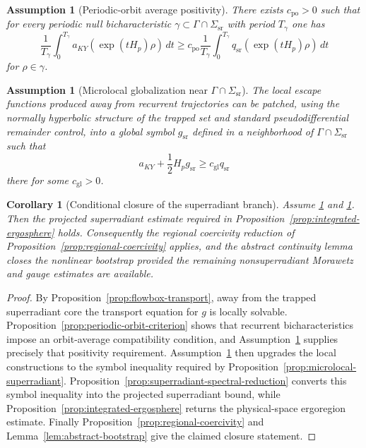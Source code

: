 \documentclass[12pt,a4paper]{article}
\newtheorem{corollary}[theorem]{Corollary}
\newtheorem{assumption}[theorem]{Assumption}
\begin{document}
\begin{assumption}[Periodic-orbit average positivity]\label{ass:periodic-average-positivity}
There exists $c_{\mathrm{po}}>0$ such that for every periodic null bicharacteristic $\gamma \subset \Gamma \cap \Sigma_{\mathrm{sr}}$ with period $T_\gamma$ one has
\begin{equation}
\frac{1}{T_\gamma}\int_0^{T_\gamma} a_{KY}(\exp(tH_p)\rho)\,dt
\ge
c_{\mathrm{po}}\frac{1}{T_\gamma}\int_0^{T_\gamma} q_{\mathrm{sr}}(\exp(tH_p)\rho)\,dt
\end{equation}
for $\rho \in \gamma$.
\end{assumption}

\begin{assumption}[Microlocal globalization near $\Gamma \cap \Sigma_{\mathrm{sr}}$]\label{ass:microlocal-globalization}
The local escape functions produced away from recurrent trajectories can be patched, using the normally hyperbolic structure of the trapped set and standard pseudodifferential remainder control, into a global symbol $g_{\mathrm{sr}}$ defined in a neighborhood of $\Gamma \cap \Sigma_{\mathrm{sr}}$ such that
\begin{equation}
a_{KY} + \frac12 H_p g_{\mathrm{sr}} \ge c_{\mathrm{gl}} q_{\mathrm{sr}}
\end{equation}
there for some $c_{\mathrm{gl}}>0$.
\end{assumption}

\begin{corollary}[Conditional closure of the superradiant branch]\label{cor:conditional-superradiant-closure}
Assume \ref{ass:periodic-average-positivity} and \ref{ass:microlocal-globalization}. Then the projected superradiant estimate required in Proposition~\ref{prop:integrated-ergosphere} holds. Consequently the regional coercivity reduction of Proposition~\ref{prop:regional-coercivity} applies, and the abstract continuity lemma closes the nonlinear bootstrap provided the remaining nonsuperradiant Morawetz and gauge estimates are available.
\end{corollary}

\begin{proof}
By Proposition~\ref{prop:flowbox-transport}, away from the trapped superradiant core the transport equation for $g$ is locally solvable. Proposition~\ref{prop:periodic-orbit-criterion} shows that recurrent bicharacteristics impose an orbit-average compatibility condition, and Assumption~\ref{ass:periodic-average-positivity} supplies precisely that positivity requirement. Assumption~\ref{ass:microlocal-globalization} then upgrades the local constructions to the symbol inequality required by Proposition~\ref{prop:microlocal-superradiant}. Proposition~\ref{prop:superradiant-spectral-reduction} converts this symbol inequality into the projected superradiant bound, while Proposition~\ref{prop:integrated-ergosphere} returns the physical-space ergoregion estimate. Finally Proposition~\ref{prop:regional-coercivity} and Lemma~\ref{lem:abstract-bootstrap} give the claimed closure statement.
\end{proof}
\end{document}
